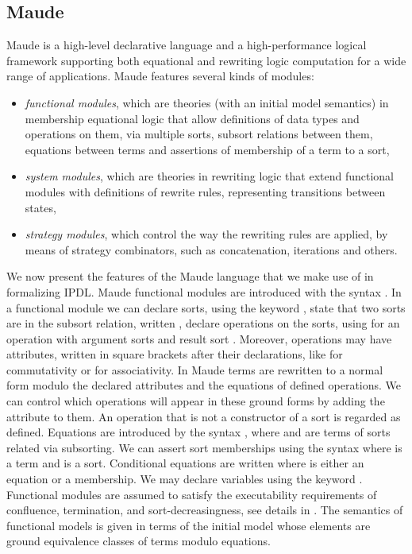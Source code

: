 \subsection{Maude}

Maude \cite{DBLP:conf/maude/2007} is a high-level declarative
language and 
a high-performance logical framework supporting both equational and rewriting logic computation for a wide range of applications. 
Maude features several kinds of modules:
\begin{itemize}
\item \emph{functional modules}, which are theories (with an initial
model semantics) in 
membership equational logic that allow definitions of 
data types and operations on them, via multiple sorts, subsort
relations between them, equations between terms and
assertions of membership of a term to a sort,
\item \emph{system modules}, which are theories in rewriting logic
that extend functional modules with
definitions of rewrite rules, representing transitions between states,
\item \emph{strategy modules}, which control 
the way the rewriting rules are applied, by means of strategy combinators,
such as concatenation, iterations and others.
\end{itemize}

We now present the features of the Maude language that we make use of
in formalizing IPDL.
Maude functional modules are introduced with the syntax
. In a functional module we can declare
sorts, using the keyword , state that two sorts are
in the subsort relation, written , declare
operations on the sorts, using  for 
an operation  with argument sorts  and 
result sort . Moreover, operations
may have attributes, written in square brackets after their declarations,
like  for commutativity or  for associativity.
In Maude terms are rewritten to a normal form modulo the declared 
attributes and the equations of defined operations. 
We can control which operations will appear in these ground
forms by adding the attribute  to them. An operation that
is not a constructor of a sort is regarded as defined. 
Equations are introduced by the syntax 
, where  and  are terms
of sorts related via subsorting. 
We can assert sort memberships using the syntax 
where  is a term and  is a sort.
Conditional equations are written
where  is either an equation or a membership.
We may declare variables using the keyword .
Functional modules are assumed to satisfy the executability requirements of confluence,
termination, and sort-decreasingness, see details
in \cite{DBLP:conf/maude/2007}.
The semantics of functional models is given in terms of the initial
model whose elements are ground equivalence classes of terms modulo
equations.

